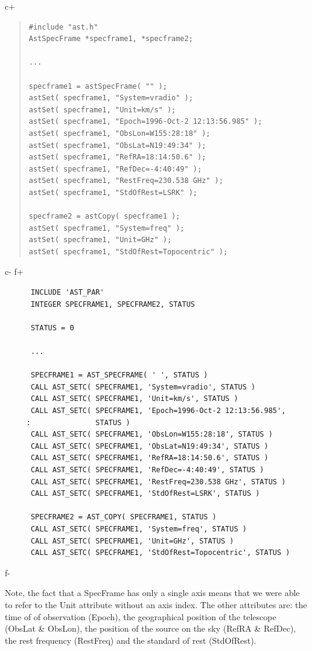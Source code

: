 \documentclass[twoside,11pt]{article}
\begin{document}
c+
\begin{quote}
\small
\begin{verbatim}
#include "ast.h"
AstSpecFrame *specframe1, *specframe2;

...

specframe1 = astSpecFrame( "" );
astSet( specframe1, "System=vradio" );
astSet( specframe1, "Unit=km/s" );
astSet( specframe1, "Epoch=1996-Oct-2 12:13:56.985" );
astSet( specframe1, "ObsLon=W155:28:18" );
astSet( specframe1, "ObsLat=N19:49:34" );
astSet( specframe1, "RefRA=18:14:50.6" );
astSet( specframe1, "RefDec=-4:40:49" );
astSet( specframe1, "RestFreq=230.538 GHz" );
astSet( specframe1, "StdOfRest=LSRK" );

specframe2 = astCopy( specframe1 );
astSet( specframe1, "System=freq" );
astSet( specframe1, "Unit=GHz" );
astSet( specframe1, "StdOfRest=Topocentric" );

\end{verbatim}
\normalsize
\end{quote}
c-
f+
\small
\begin{verbatim}
      INCLUDE 'AST_PAR'
      INTEGER SPECFRAME1, SPECFRAME2, STATUS

      STATUS = 0

      ...

      SPECFRAME1 = AST_SPECFRAME( ' ', STATUS )
      CALL AST_SETC( SPECFRAME1, 'System=vradio', STATUS )
      CALL AST_SETC( SPECFRAME1, 'Unit=km/s', STATUS )
      CALL AST_SETC( SPECFRAME1, 'Epoch=1996-Oct-2 12:13:56.985',
     :               STATUS )
      CALL AST_SETC( SPECFRAME1, 'ObsLon=W155:28:18', STATUS )
      CALL AST_SETC( SPECFRAME1, 'ObsLat=N19:49:34', STATUS )
      CALL AST_SETC( SPECFRAME1, 'RefRA=18:14:50.6', STATUS )
      CALL AST_SETC( SPECFRAME1, 'RefDec=-4:40:49', STATUS )
      CALL AST_SETC( SPECFRAME1, 'RestFreq=230.538 GHz', STATUS )
      CALL AST_SETC( SPECFRAME1, 'StdOfRest=LSRK', STATUS )

      SPECFRAME2 = AST_COPY( SPECFRAME1, STATUS )
      CALL AST_SETC( SPECFRAME1, 'System=freq', STATUS )
      CALL AST_SETC( SPECFRAME1, 'Unit=GHz', STATUS )
      CALL AST_SETC( SPECFRAME1, 'StdOfRest=Topocentric', STATUS )

\end{verbatim}
\normalsize
f-

Note, the fact that a SpecFrame has only a single axis means that we were
able to refer to the Unit attribute without an axis index. The other
attributes are: the time of of observation (Epoch), the geographical
position of the telescope (ObsLat \& ObsLon), the position of the source
on the sky (RefRA \& RefDec), the rest frequency (RestFreq) and the
standard of rest (StdOfRest).
\end{document}
